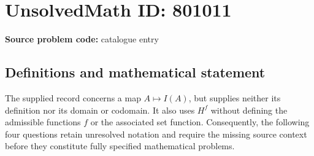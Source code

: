 \documentclass[11pt]{article}
\begin{document}
\section*{UnsolvedMath ID: 801011}
\textbf{Source problem code:} catalogue entry
\subsection{Definitions and mathematical statement}
The supplied record concerns a map \(A\mapsto I(A)\), but supplies neither its definition nor its domain or codomain. It also uses \(H^f\) without defining the admissible functions \(f\) or the associated set function. Consequently, the following four questions retain unresolved notation and require the missing source context before they constitute fully specified mathematical problems.
\end{document}
